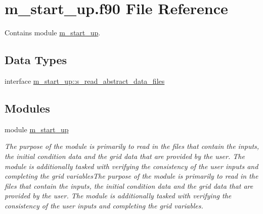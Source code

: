 \hypertarget{m__start__up_8f90}{}\section{m\+\_\+start\+\_\+up.\+f90 File Reference}
\label{m__start__up_8f90}


Contains module \hyperlink{namespacem__start__up}{m\+\_\+start\+\_\+up}.  


\subsection*{Data Types}
\begin{DoxyCompactItemize}
\item 
interface \hyperlink{interfacem__start__up_1_1s__read__abstract__data__files}{m\+\_\+start\+\_\+up\+::s\+\_\+read\+\_\+abstract\+\_\+data\+\_\+files}
\end{DoxyCompactItemize}
\subsection*{Modules}
\begin{DoxyCompactItemize}
\item 
module \hyperlink{namespacem__start__up}{m\+\_\+start\+\_\+up}
\begin{DoxyCompactList}\small\item\em The purpose of the module is primarily to read in the files that contain the inputs, the initial condition data and the grid data that are provided by the user. The module is additionally tasked with verifying the consistency of the user inputs and completing the grid variables\+The purpose of the module is primarily to read in the files that contain the inputs, the initial condition data and the grid data that are provided by the user. The module is additionally tasked with verifying the consistency of the user inputs and completing the grid variables. \end{DoxyCompactList}\end{DoxyCompactItemize}
